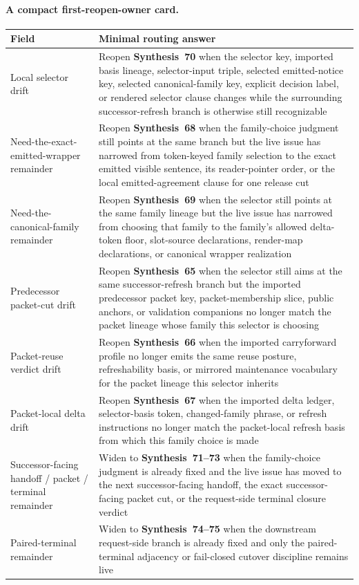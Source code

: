 \documentclass[11pt]{article}
\begin{document}
\paragraph{A compact first-reopen-owner card.}
\begin{center}
\small
\begin{tabularx}{\linewidth}{@{}lX@{}}
\toprule
Field & Minimal routing answer \\
\midrule
Local selector drift & Reopen \textbf{Synthesis~70} when the selector key, imported basis lineage, selector-input triple, selected emitted-notice key, selected canonical-family key, explicit decision label, or rendered selector clause changes while the surrounding successor-refresh branch is otherwise still recognizable \\
Need-the-exact-emitted-wrapper remainder & Reopen \textbf{Synthesis~68} when the family-choice judgment still points at the same branch but the live issue has narrowed from token-keyed family selection to the exact emitted visible sentence, its reader-pointer order, or the local emitted-agreement clause for one release cut \\
Need-the-canonical-family remainder & Reopen \textbf{Synthesis~69} when the selector still points at the same family lineage but the live issue has narrowed from choosing that family to the family's allowed delta-token floor, slot-source declarations, render-map declarations, or canonical wrapper realization \\
Predecessor packet-cut drift & Reopen \textbf{Synthesis~65} when the selector still aims at the same successor-refresh branch but the imported predecessor packet key, packet-membership slice, public anchors, or validation companions no longer match the packet lineage whose family this selector is choosing \\
Packet-reuse verdict drift & Reopen \textbf{Synthesis~66} when the imported carryforward profile no longer emits the same reuse posture, refreshability basis, or mirrored maintenance vocabulary for the packet lineage this selector inherits \\
Packet-local delta drift & Reopen \textbf{Synthesis~67} when the imported delta ledger, selector-basis token, changed-family phrase, or refresh instructions no longer match the packet-local refresh basis from which this family choice is made \\
Successor-facing handoff / packet / terminal remainder & Widen to \textbf{Synthesis~71--73} when the family-choice judgment is already fixed and the live issue has moved to the next successor-facing handoff, the exact successor-facing packet cut, or the request-side terminal closure verdict \\
Paired-terminal remainder & Widen to \textbf{Synthesis~74--75} when the downstream request-side branch is already fixed and only the paired-terminal adjacency or fail-closed cutover discipline remains live \\
\bottomrule
\end{tabularx}
\end{center}
\end{document}
